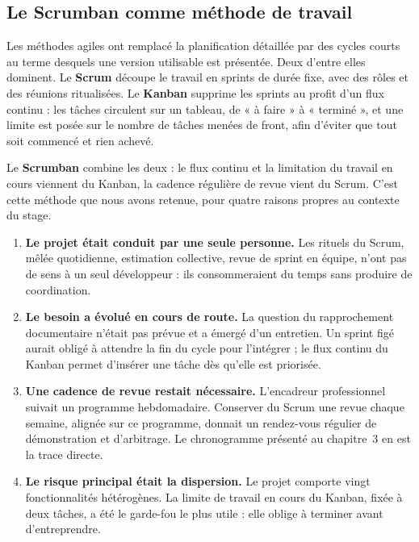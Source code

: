 \subsection{Le Scrumban comme méthode de travail}

Les méthodes agiles ont remplacé la planification détaillée par des cycles
courts au terme desquels une version utilisable est présentée. Deux d'entre
elles dominent. Le \textbf{Scrum} découpe le travail en sprints de durée fixe,
avec des rôles et des réunions ritualisées. Le \textbf{Kanban} supprime les
sprints au profit d'un flux continu : les tâches circulent sur un tableau, de
« à faire » à « terminé », et une limite est posée sur le nombre de tâches
menées de front, afin d'éviter que tout soit commencé et rien achevé.

Le \textbf{Scrumban} combine les deux : le flux continu et la limitation du
travail en cours viennent du Kanban, la cadence régulière de revue vient du
Scrum. C'est cette méthode que nous avons retenue, pour quatre raisons propres
au contexte du stage.

\begin{enumerate}
  \item \textbf{Le projet était conduit par une seule personne.} Les rituels du
        Scrum, mêlée quotidienne, estimation collective, revue de sprint en
        équipe, n'ont pas de sens à un seul développeur : ils consommeraient du
        temps sans produire de coordination.

  \item \textbf{Le besoin a évolué en cours de route.} La question du
        rapprochement documentaire n'était pas prévue et a émergé d'un
        entretien. Un sprint figé aurait obligé à attendre la fin du cycle pour
        l'intégrer ; le flux continu du Kanban permet d'insérer une tâche dès
        qu'elle est priorisée.

  \item \textbf{Une cadence de revue restait nécessaire.} L'encadreur
        professionnel suivait un programme hebdomadaire. Conserver du Scrum une
        revue chaque semaine, alignée sur ce programme, donnait un rendez-vous
        régulier de démonstration et d'arbitrage. Le chronogramme présenté au
        chapitre~3 en est la trace directe.

  \item \textbf{Le risque principal était la dispersion.} Le projet comporte
        vingt fonctionnalités hétérogènes. La limite de travail en cours du
        Kanban, fixée à deux tâches, a été le garde-fou le plus utile : elle
        oblige à terminer avant d'entreprendre.
\end{enumerate}

